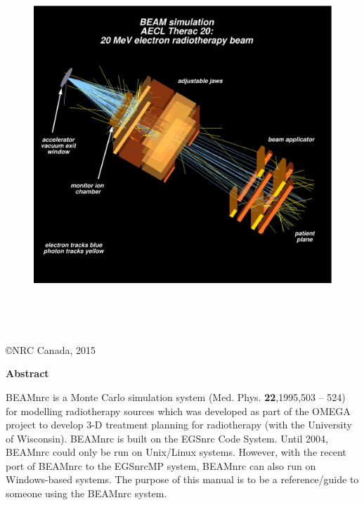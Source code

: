 \documentclass[12pt,twoside]{article}
\begin{document}
\begin{figure}[h]
\begin{center}
\leavevmode
\includegraphics[height=14cm]{figures/th20_20-new}
\end{center}
\end{figure}

\begin{center}

\vfill
\copyright NRC Canada, 2015
\end{center}

\setlength{\baselineskip}{0.5cm}
\newpage

\pagestyle{fancy}
\setcounter{page}{2}


\newpage

\begin{center}
\begin{Large}
{\bf Abstract}
\end{Large}
\end{center}
BEAMnrc is a Monte Carlo simulation system (Med. Phys. {\bf 22},1995,503 --
524) for modelling radiotherapy
sources which was developed as part of the OMEGA project to develop 3-D
treatment planning for radiotherapy
(with the University of Wisconsin).  BEAMnrc is built on the
EGSnrc Code System\cite{KR03}.  Until 2004, BEAMnrc could only
be run on Unix/Linux systems.  However, with the recent port
of BEAMnrc to the EGSnrcMP system\cite{Ka03}, BEAMnrc can also
run on Windows-based systems.
The purpose of this manual is to be a reference/guide to someone
using the BEAMnrc system.
\end{document}
